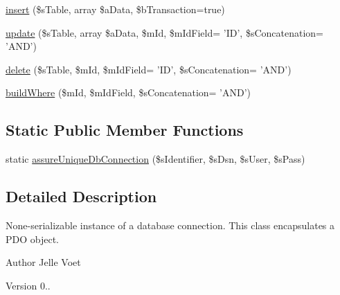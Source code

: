 \begin{DoxyCompactItemize}
\item 
\hyperlink{class_db_connection_ab9c7b4ab2255582a534f59f8af9af629}{insert} (\$s\-Table, array \$a\-Data, \$b\-Transaction=true)
\item 
\hyperlink{class_db_connection_afe5a8ecd5852cd3a8a713d1775372676}{update} (\$s\-Table, array \$a\-Data, \$m\-Id, \$m\-Id\-Field= 'I\-D', \$s\-Concatenation= 'A\-N\-D')
\item 
\hyperlink{class_db_connection_a2da0f32a8ea737be8043a6ec0fe4635e}{delete} (\$s\-Table, \$m\-Id, \$m\-Id\-Field= 'I\-D', \$s\-Concatenation= 'A\-N\-D')
\item 
\hyperlink{class_db_connection_a2c260a0d5e6452a7b2771cbc40205b48}{build\-Where} (\$m\-Id, \$m\-Id\-Field, \$s\-Concatenation= 'A\-N\-D')
\end{DoxyCompactItemize}
\subsection*{Static Public Member Functions}
\begin{DoxyCompactItemize}
\item 
static \hyperlink{class_db_connection_a5e6943a858fde652efac97a128c2ac79}{assure\-Unique\-Db\-Connection} (\$s\-Identifier, \$s\-Dsn, \$s\-User, \$s\-Pass)
\end{DoxyCompactItemize}


\subsection{Detailed Description}
None-\/serializable instance of a database connection. This class encapsulates a P\-D\-O object.

\begin{DoxyAuthor}{Author}
Jelle Voet 
\end{DoxyAuthor}
\begin{DoxyVersion}{Version}
0.. 
\end{DoxyVersion}


